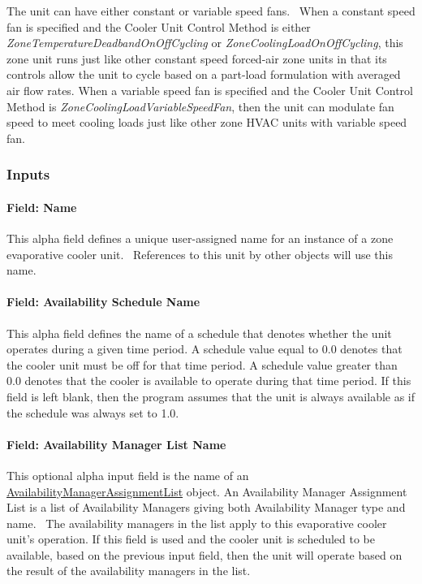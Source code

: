 The unit can have either constant or variable speed fans.~ When a constant speed fan is specified and the Cooler Unit Control Method is either \textit{ZoneTemperatureDeadbandOnOffCycling} or \textit{ZoneCoolingLoadOnOffCycling}, this zone unit runs just like other constant speed forced-air zone units in that its controls allow the unit to cycle based on a part-load formulation with averaged air flow rates. When a variable speed fan is specified and the Cooler Unit Control Method is \textit{ZoneCoolingLoadVariableSpeedFan}, then the unit can modulate fan speed to meet cooling loads just like other zone HVAC units with variable speed fan.

\subsubsection{Inputs}\label{inputs-4-040}

\paragraph{Field: Name}\label{field-name-4-035}

This alpha field defines a unique user-assigned name for an instance of a zone evaporative cooler unit.~ References to this unit by other objects will use this name.

\paragraph{Field: Availability Schedule Name}\label{field-availability-schedule-name-4-007}

This alpha field defines the name of a schedule that denotes whether the unit operates during a given time period. A schedule value equal to 0.0 denotes that the cooler unit must be off for that time period. A schedule value greater than 0.0 denotes that the cooler is available to operate during that time period. If this field is left blank, then the program assumes that the unit is always available as if the schedule was always set to 1.0.

\paragraph{Field: Availability Manager List Name}\label{field-availability-manager-list-name-3}

This optional alpha input field is the name of an \hyperref[availabilitymanagerassignmentlist]{AvailabilityManagerAssignmentList} object. An Availability Manager Assignment List is a list of Availability Managers giving both Availability Manager type and name.~ The availability managers in the list apply to this evaporative cooler unit's operation. If this field is used and the cooler unit is scheduled to be available, based on the previous input field, then the unit will operate based on the result of the availability managers in the list.

